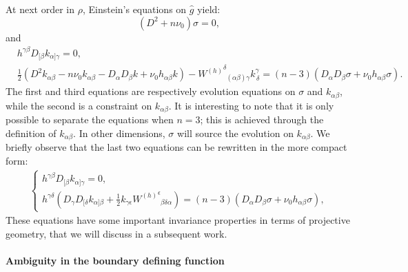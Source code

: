 \documentclass[a4paper, 10pt]{article}
\theoremstyle{remark}
\newcommand{\pg}{\hat{g}}
\begin{document}
At next order in $\rho$, Einstein's equations on $\pg$ yield:
\begin{equation}
    (D^2 + n \nu_0) \sigma =0, \label{Ashtekar Romano: Einstein equations on sigma}
\end{equation}
and
\begin{align*}
 &h^{\gamma\beta}D_{[\beta} k_{\alpha]\gamma} =0, \\
    &\frac{1}{2}(D^2k_{\alpha\beta}-n\nu_0k_{\alpha\beta}-D_{\alpha}D_{\beta} k + \nu_0h_{\alpha\beta}k) -{W^{(h)}}_{\phantom{\delta}(\alpha\beta)\gamma}^{\delta}k^\gamma_{\,\delta}=(n-3)\left(D_{\alpha}D_{\beta}\sigma + \nu_0h_{\alpha\beta} \sigma\right). %
\end{align*}
The first and third equations are respectively evolution equations on $\sigma$ and $k_{\alpha \beta}$, while the second is a constraint on $k_{\alpha \beta}$. It is interesting to note that it is only possible to separate the equations when $n=3$; this is achieved through the definition of $k_{\alpha \beta}$. In other dimensions, $\sigma$ will source the evolution on $k_{\alpha \beta}$. We briefly observe that the last two equations can be rewritten in the more compact form:
\begin{gather}
   \begin{cases}h^{\gamma\beta}D_{[\beta} k_{\alpha]\gamma} =0, \\[0.5em]
h^{\gamma\delta}\left(D_{\gamma} D_{[\delta}k_{\alpha]\beta} + \frac{1}{2}k_{\gamma\epsilon}{W^{(h)}}_{\phantom{\epsilon}\beta\delta\alpha}^{\epsilon}\right) =(n-3)(D_\alpha D_\beta \sigma + \nu_0h_{\alpha\beta}\sigma), \label{Ashtekar Romano: Einstein equations on k}
    \end{cases}
\end{gather}
 These equations have some important invariance properties in terms of projective geometry, that we will discuss in a subsequent work.

\paragraph{Ambiguity in the boundary defining function}\mbox{}
\end{document}
